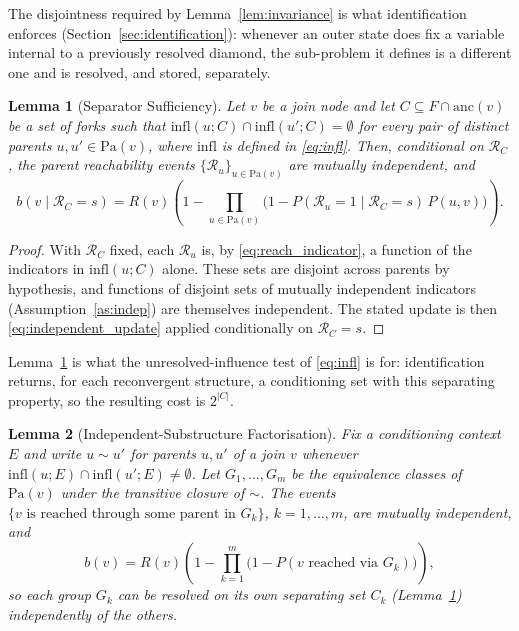 \documentclass[preprint,12pt]{elsarticle}
\newtheorem{lemma}{Lemma}[section]
\begin{document}
The disjointness required by Lemma~\ref{lem:invariance} is what identification enforces (Section~\ref{sec:identification}): whenever an outer state does fix a variable internal to a previously resolved diamond, the sub-problem it defines is a different one and is resolved, and stored, separately.

\begin{lemma}[Separator Sufficiency]\label{lem:separator}
Let $v$ be a join node and let $C \subseteq F \cap \mathrm{anc}(v)$ be a set of forks such that $\mathrm{infl}(u;C)\cap\mathrm{infl}(u';C)=\emptyset$ for every pair of distinct parents $u,u'\in\mathrm{Pa}(v)$, where $\mathrm{infl}$ is defined in \eqref{eq:infl}. Then, conditional on $\mathcal{R}_C$, the parent reachability events $\{\mathcal{R}_u\}_{u\in\mathrm{Pa}(v)}$ are mutually independent, and
\begin{equation}
b(v\mid \mathcal{R}_C=s) = R(v)\left(1-\prod_{u\in\mathrm{Pa}(v)}\bigl(1-P(\mathcal{R}_u=1\mid \mathcal{R}_C=s)\,P(u,v)\bigr)\right).
\end{equation}
\end{lemma}

\begin{proof}
With $\mathcal{R}_C$ fixed, each $\mathcal{R}_u$ is, by \eqref{eq:reach_indicator}, a function of the indicators in $\mathrm{infl}(u;C)$ alone. These sets are disjoint across parents by hypothesis, and functions of disjoint sets of mutually independent indicators (Assumption~\ref{as:indep}) are themselves independent. The stated update is then \eqref{eq:independent_update} applied conditionally on $\mathcal{R}_C=s$.
\end{proof}

Lemma~\ref{lem:separator} is what the unresolved-influence test of \eqref{eq:infl} is for: identification returns, for each reconvergent structure, a conditioning set with this separating property, so the resulting cost is $2^{|C|}$.

\begin{lemma}[Independent-Substructure Factorisation]\label{lem:factorisation}
Fix a conditioning context $E$ and write $u\sim u'$ for parents $u,u'$ of a join $v$ whenever $\mathrm{infl}(u;E)\cap\mathrm{infl}(u';E)\neq\emptyset$. Let $G_1,\ldots,G_m$ be the equivalence classes of $\mathrm{Pa}(v)$ under the transitive closure of $\sim$. The events $\{v\text{ is reached through some parent in }G_k\}$, $k=1,\ldots,m$, are mutually independent, and
\begin{equation}
b(v) = R(v)\left(1-\prod_{k=1}^{m}\bigl(1-P(v\text{ reached via }G_k)\bigr)\right),
\end{equation}
so each group $G_k$ can be resolved on its own separating set $C_k$ (Lemma~\ref{lem:separator}) independently of the others.
\end{lemma}
\end{document}
